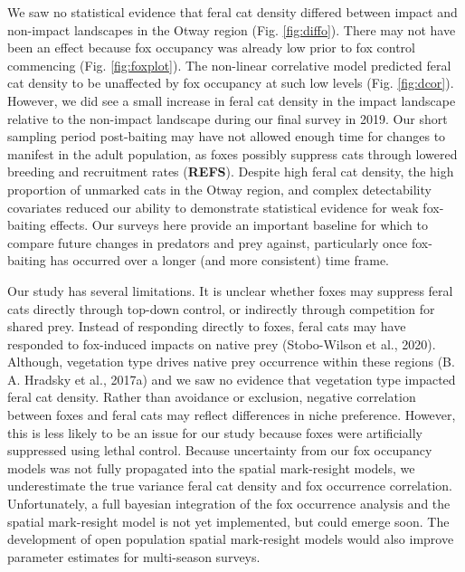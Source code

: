 \documentclass[]{elsarticle} %
\begin{document}
We saw no statistical evidence that feral cat density differed between impact and non-impact landscapes in the Otway region (Fig. \ref{fig:diffo}). There may not have been an effect because fox occupancy was already low prior to fox control commencing (Fig. \ref{fig:foxplot}). The non-linear correlative model predicted feral cat density to be unaffected by fox occupancy at such low levels (Fig. \ref{fig:dcor}). However, we did see a small increase in feral cat density in the impact landscape relative to the non-impact landscape during our final survey in 2019. Our short sampling period post-baiting may have not allowed enough time for changes to manifest in the adult population, as foxes possibly suppress cats through lowered breeding and recruitment rates (\textbf{REFS}). Despite high feral cat density, the high proportion of unmarked cats in the Otway region, and complex detectability covariates reduced our ability to demonstrate statistical evidence for weak fox-baiting effects. Our surveys here provide an important baseline for which to compare future changes in predators and prey against, particularly once fox-baiting has occurred over a longer (and more consistent) time frame.

Our study has several limitations. It is unclear whether foxes may suppress feral cats directly through top-down control, or indirectly through competition for shared prey. Instead of responding directly to foxes, feral cats may have responded to fox-induced impacts on native prey (Stobo-Wilson et al., 2020). Although, vegetation type drives native prey occurrence within these regions (B. A. Hradsky et al., 2017a) and we saw no evidence that vegetation type impacted feral cat density. Rather than avoidance or exclusion, negative correlation between foxes and feral cats may reflect differences in niche preference. However, this is less likely to be an issue for our study because foxes were artificially suppressed using lethal control. Because uncertainty from our fox occupancy models was not fully propagated into the spatial mark-resight models, we underestimate the true variance feral cat density and fox occurrence correlation. Unfortunately, a full bayesian integration of the fox occurrence analysis and the spatial mark-resight model is not yet implemented, but could emerge soon. The development of open population spatial mark-resight models would also improve parameter estimates for multi-season surveys.
\end{document}

